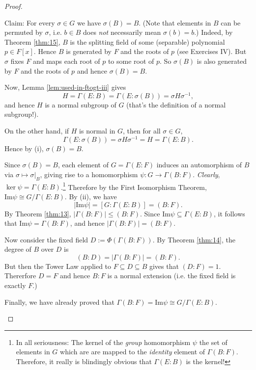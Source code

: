 \begin{theorem}
\begin{proof}
\begin{enumerate}[(i)]
			Claim: For every $\sigma \in G$ we have $\sigma(B) = B$. (Note that elements in $B$ can be permuted by $\sigma$, i.e. $b \in B$ does \emph{not} necessarily mean $\sigma(b) = b$.) Indeed, by Theorem \ref{thm:15}, $B$ is the splitting field of some (separable) polynomial $p \in F[x]$. Hence $B$ is generated by $F$ and the roots of $p$ (see Exercises IV). But $\sigma$ fixes $F$ and maps each root of $p$ to some root of $p$. So $\sigma(B)$ is also generated by $F$ and the roots of $p$ and hence $\sigma(B) = B$.
			
			Now, Lemma \ref{lem:used-in-ftogt-iii} gives
			\[
				H = \Gamma(E : B) = \Gamma(E : \sigma(B)) = \sigma H \sigma^{-1},
			\]
			and hence $H$ is a normal subgroup of $G$ (that's the definition of a normal subgroup!).
			
			On the other hand, if $H$ is normal in $G$, then for all $\sigma \in G$,
			\[
				\Gamma(E : \sigma(B)) = \sigma H \sigma^{-1} = H = \Gamma(E : B).
			\]
			Hence by (i), $\sigma(B) = B$.
			
			Since $\sigma(B) = B$, each element of $G = \Gamma(E : F)$ induces an automorphism of $B$ via $\sigma \mapsto \sigma|_B$, giving rise to a homomorphism $\psi : G \to \Gamma(B : F)$. \emph{Clearly}, $\ker{\psi} = \Gamma(E : B)$.\footnote{In all seriousness: The kernel of the \emph{group} homomorphism $\psi$  the set of elements in $G$ which are are mapped to the \emph{identity} element of $\Gamma(B : F)$. Therefore, it really is blindingly obvious that $\Gamma(E : B)$ is the kernel!} Therefore by the First Isomorphism Theorem, $\text{Im}{\psi} \cong G / \Gamma(E : B)$. By (ii), we have
			\[
				|\text{Im}{\psi}| = [G : \Gamma(E : B)] = (B : F).
			\]
			By Theorem \ref{thm:13}, $|\Gamma(B : F)| \leq (B : F)$. Since $\text{Im}{\psi} \subseteq \Gamma(E : B)$, it follows that $\text{Im}{\psi} = \Gamma(B : F)$, and hence $|\Gamma(B : F)| = (B : F)$.
			
			Now consider the fixed field $D := \Phi(\Gamma(B : F))$. By Theorem \ref{thm:14}, the degree of $B$ over $D$ is
			\[
				(B : D) = |\Gamma(B : F)| = (B : F).
			\]
			But then the Tower Law applied to $F \subseteq D \subseteq B$ gives that $(D : F) = 1$. Thererfore $D = F$ and hence $B : F$ is a normal extension (i.e. the fixed field is exactly $F$.)
			
			Finally, we have already proved that $\Gamma(B : F) = \text{Im}{\psi} \cong G / \Gamma(E : B)$.
		\end{enumerate}
	\end{proof}
\end{theorem}

